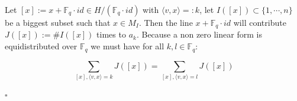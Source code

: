 \documentclass{article}
\begin{document}
\vspace{0.3 cm}
Let $[x]:=x + \mathbb{F}_q  \cdot id \in H / (\mathbb{F}_q \cdot id)$  with $\langle v,x\rangle =: k$, let $I([x]) \subset \{1,\cdots,n\}$ be a biggest subset such that $x \in M_I$. Then the line $x + \mathbb{F}_q \cdot id$ will contribute $J([x]):=\#I([x])$ times to $a_k$. Because a non zero linear form is equidistributed over $\mathbb{F}_q$ we must have for all $k,l \in \mathbb{F}_q$:

\[
\sum_{[x], \langle v,x \rangle = k} J([x]) = \sum_{[x], \langle v,x \rangle = l} J([x])
\]

\vspace{0.3cm}

\hfill $\square $
\end{document}

